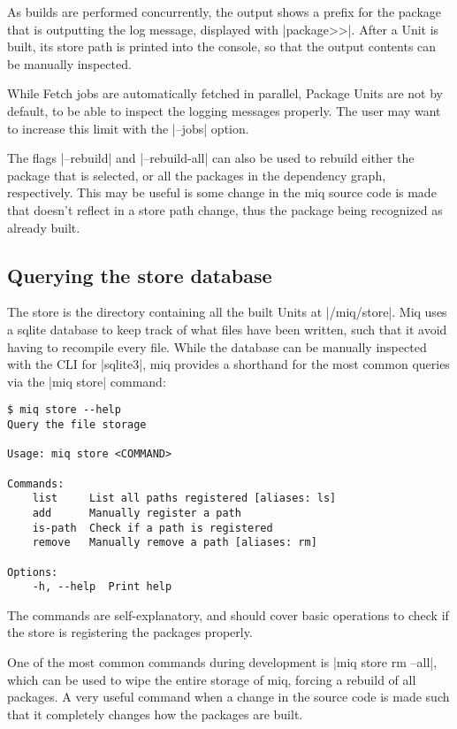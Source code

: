 As builds are performed concurrently, the output shows a
prefix for the package that is outputting the log message,
displayed with |package>>|. After a Unit is built, its store
path is printed into the console, so that the output
contents can be manually inspected.

While Fetch jobs are automatically fetched in parallel,
Package Units are not by default, to be able to inspect the
logging messages properly. The user may want to increase
this limit with the |--jobs| option.

The flags |--rebuild| and |--rebuild-all| can also be used
to rebuild either the package that is selected, or all the
packages in the dependency graph, respectively. This may be
useful is some change in the miq source code is made that
doesn't reflect in a store path change, thus the package
being recognized as already built.

\subsection{Querying the store database}

The store is the directory containing all the built Units at
|/miq/store|. Miq uses a sqlite database to keep track of
what files have been written, such that it avoid having to
recompile every file. While the database can be manually
inspected with the \ac{CLI} for |sqlite3|, miq provides a
shorthand for the most common queries via the |miq store|
command:

\begin{verbatim}
$ miq store --help
Query the file storage

Usage: miq store <COMMAND>

Commands:
    list     List all paths registered [aliases: ls]
    add      Manually register a path
    is-path  Check if a path is registered
    remove   Manually remove a path [aliases: rm]

Options:
    -h, --help  Print help
\end{verbatim}

The commands are self-explanatory, and should cover basic
operations to check if the store is registering the packages
properly.

One of the most common commands during development is |miq store rm --all|, which can be used to wipe the entire
storage of miq, forcing a rebuild of all packages. A very
useful command when a change in the source code is made such
that it completely changes how the packages are built.

